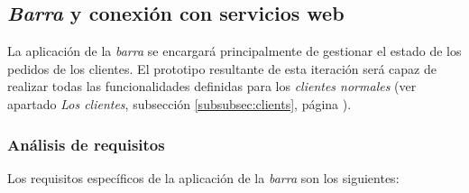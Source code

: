 
\subsection{\emph{Barra} y conexión con servicios web}
La aplicación de la \emph{barra} se encargará principalmente de gestionar el
estado de los pedidos de los clientes. El prototipo resultante de esta
iteración será capaz de realizar todas las funcionalidades definidas para
los \emph{clientes normales} (ver apartado \emph{Los clientes},
subsección \ref{subsubsec:clients}, página \pageref{subsubsec:clients}).

\subsubsection{Análisis de requisitos}
Los requisitos específicos de la aplicación de la \emph{barra} son los
siguientes:
